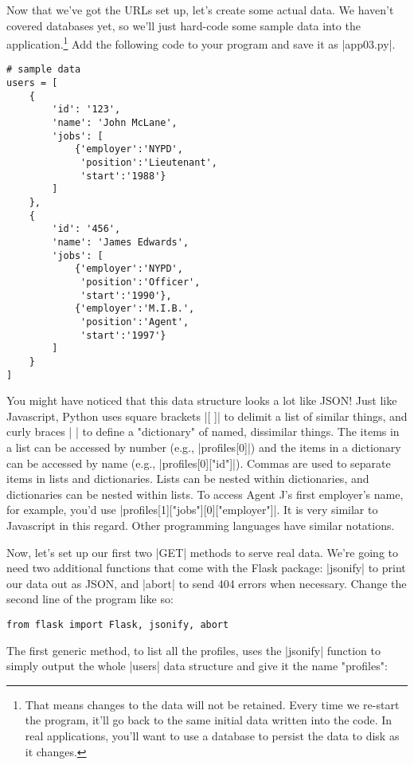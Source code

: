 \documentclass[11pt]{book}
\begin{document}
Now that we've got the URLs set up, let's create some actual data.  We haven't covered databases yet, so we'll just hard-code some sample data into the application.\footnote{That means changes to the data will not be retained.  Every time we re-start the program, it'll go back to the same initial data written into the code.  In real applications, you'll want to use a database to persist the data to disk as it changes.}  Add the following code to your program and save it as |app03.py|.

\begin{verbatim}
# sample data
users = [
    {
        'id': '123',
        'name': 'John McLane',
        'jobs': [
            {'employer':'NYPD',
             'position':'Lieutenant',
             'start':'1988'}
        ]
    },
    {
        'id': '456',
        'name': 'James Edwards',
        'jobs': [
            {'employer':'NYPD',
             'position':'Officer',
             'start':'1990'},
            {'employer':'M.I.B.',
             'position':'Agent',
             'start':'1997'}
        ]
    }
]
\end{verbatim}

You might have noticed that this data structure looks a lot like JSON!  Just like Javascript, Python uses square brackets |[ ]| to delimit a list of similar things, and curly braces |{ }| to define a "dictionary" of named, dissimilar things.  The items in a list can be accessed by number (e.g., |profiles[0]|) and the items in a dictionary can be accessed by name (e.g., |profiles[0]["id"]|).  Commas are used to separate items in lists and dictionaries.  Lists can be nested within dictionaries, and dictionaries can be nested within lists.  To access Agent J's first employer's name, for example, you'd use |profiles[1]["jobs"][0]["employer"]|.  It is very similar to Javascript in this regard.  Other programming languages have similar notations.

Now, let's set up our first two |GET| methods to serve real data.  We're going to need two additional functions that come with the Flask package: |jsonify| to print our data out as JSON, and |abort| to send 404 errors when necessary.  Change the second line of the program like so:

\begin{verbatim}
from flask import Flask, jsonify, abort
\end{verbatim}

The first generic method, to list all the profiles, uses the |jsonify| function to simply output the whole |users| data structure and give it the name "profiles":
\end{document}
